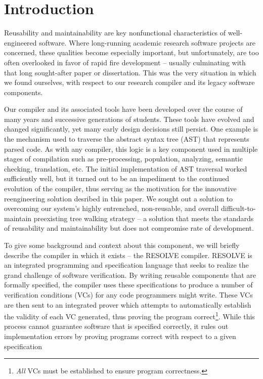 \documentclass[times]{speauth}
\begin{document}

\section{Introduction}
\vspace{-2pt}
Reusability and maintainability are key nonfunctional characteristics of well-engineered software. Where long-running academic research software projects are concerned, these qualities become especially important, but unfortunately, are too often overlooked in favor of rapid fire development -- usually culminating with that long sought-after paper or dissertation. This was the very situation in which we found ourselves, with respect to our research compiler and its legacy software components.

Our compiler and its associated tools have been developed over the course of many years and successive generations of students. These tools have evolved and changed significantly, yet many early design decisions still persist. One example is the mechanism used to traverse the abstract syntax tree (AST) that represents parsed code. As with any compiler, this logic is a key component used in multiple stages of compilation such as pre-processing, population, analyzing, semantic checking, translation, etc. The initial implementation of AST traversal worked sufficiently well, but it turned out to be an impediment to the continued evolution of the compiler, thus serving as the motivation for the innovative reengineering solution desribed in this paper. We sought out a solution to overcoming our system's highly entrenched, non-reusable, and overall difficult-to-maintain preexisting tree walking strategy -- a solution that meets the standards of reusability and maintainability but does not compromise rate of development.

To give some background and context about this component, we will briefly describe the compiler in which it exists -- the RESOLVE compiler. RESOLVE is an integrated programming and specification language that seeks to realize the grand challenge of software verification. By writing reusable components that are formally specified, the compiler uses these specifications to produce a number of verification conditions (VCs) for any code programmers might write. These VCs are then sent to an integrated prover which attempts to automatically establish the validity of each VC generated, thus proving the program correct\footnote{\textit{All} VCs must be established to ensure program correctness.}. While this process cannot guarantee software that is specified correctly, it rules out implementation errors by proving programs correct with respect to a given specification
\end{document}
